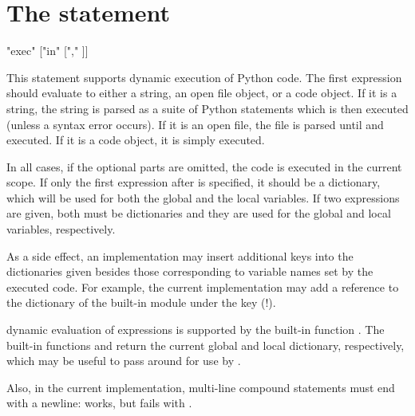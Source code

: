 \section{The  statement \label{exec}}

\begin{productionlist}
             {"exec" 
              ["in"  ["," ]]}
\end{productionlist}

This statement supports dynamic execution of Python code.  The first
expression should evaluate to either a string, an open file object, or
a code object.  If it is a string, the string is parsed as a suite of
Python statements which is then executed (unless a syntax error
occurs).  If it is an open file, the file is parsed until \EOF{} and
executed.  If it is a code object, it is simply executed.

In all cases, if the optional parts are omitted, the code is executed
in the current scope.  If only the first expression after 
is specified, it should be a dictionary, which will be used for both
the global and the local variables.  If two expressions are given,
both must be dictionaries and they are used for the global and local
variables, respectively.

As a side effect, an implementation may insert additional keys into
the dictionaries given besides those corresponding to variable names
set by the executed code.  For example, the current implementation
may add a reference to the dictionary of the built-in module
 under the key  (!).

dynamic evaluation of expressions is supported by the built-in
function .  The built-in functions
 and  return the current global
and local dictionary, respectively, which may be useful to pass around
for use by .

Also, in the current implementation, multi-line compound statements must
end with a newline:
 works, but
 fails with
.
  

